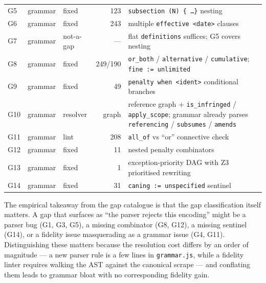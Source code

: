 \begin{table}[t]
\begin{small}
\begin{tabular}{@{}lllrp{3.6cm}@{}}
\textsf{G5}  & grammar       & fixed     & 123 & \texttt{subsection (N) \{ \dots \}} nesting \\
\textsf{G6}  & grammar       & fixed     & 243 & multiple \texttt{effective <date>} clauses \\
\textsf{G7}  & grammar       & not-a-gap & ---  & flat \texttt{definitions} suffices; G5 covers nesting \\
\textsf{G8}  & grammar       & fixed     & 249/190 & \texttt{or\_both} / \texttt{alternative} / \texttt{cumulative}; \texttt{fine := unlimited} \\
\textsf{G9}  & grammar       & fixed     &  49 & \texttt{penalty when <ident>} conditional branches \\
\textsf{G10} & grammar       & resolver  & graph & reference graph + \texttt{is\_infringed} / \texttt{apply\_scope}; grammar already parses \texttt{referencing} / \texttt{subsumes} / \texttt{amends} \\
\textsf{G11} & grammar       & lint      & 208 & \texttt{all\_of} vs ``or'' connective check \\
\textsf{G12} & grammar       & fixed     &  11 & nested penalty combinators \\
\textsf{G13} & grammar       & fixed     &   1 & exception-priority DAG with Z3 prioritised rewriting \\
\textsf{G14} & grammar       & fixed     &  31 & \texttt{caning := unspecified} sentinel \\
\bottomrule
\end{tabular}
\end{small}
\end{table}

The empirical takeaway from the gap catalogue is that the gap classification
itself matters. A gap that surfaces as ``the parser rejects this encoding''
might be a parser bug (\textsf{G1}, \textsf{G3}, \textsf{G5}), a missing
combinator (\textsf{G8}, \textsf{G12}), a missing sentinel (\textsf{G14}),
or a fidelity issue masquerading as a grammar issue (\textsf{G4},
\textsf{G11}). Distinguishing these matters because the resolution cost
differs by an order of magnitude --- a new parser rule is a few lines
in \texttt{grammar.js}, while a fidelity linter requires walking the AST
against the canonical scrape --- and conflating them leads to grammar
bloat with no corresponding fidelity gain.

